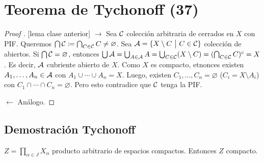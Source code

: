 
\section{Teorema de Tychonoff (37)}

\begin{proof}[Proof ][lema clase anterior]
	$\boxed{\rightarrow}$ Sea $\mathcal{C}$ colección arbitraria de cerrados en $X$ con PIF. Queremos $\bigcap \mathcal{C} \coloneq \bigcap_{C \in \mathcal{C}} C \neq \varnothing$. Sea $\mathcal{A} = \{X \setminus C \ \big| \ C \in \mathcal{C}\}$ colección de abiertos. Si $\bigcap \mathcal{C} = \varnothing$, entonces $\bigcup \mathcal{A} = \bigcup_{A \in \mathcal{A}} A = \bigcup_{C \in \mathcal{C}} (X \setminus C) = (\bigcap_{C \in \mathcal{C}} C)^c = X$. Es decir, $\mathcal{A}$ cubriente abierto de $X$. Como $X$ es compacto, etnonces existen $A_{1},\dots,A_{n} \in \mathcal{A}$ con $A_{1} \cup \cdots \cup A_{n} = X$. Luego, existen $C_{1},\dots,C_{n} = \varnothing$ ($C_{i} = X \setminus A_{i}$) con $C_{1} \cap \cdots \cap C_{n} = \varnothing$. Pero esto contradice que $\mathcal{C}$ tenga la PIF.\par
	$\boxed{\leftarrow}$ Análogo.
\end{proof}

\subsection{Demostración Tychonoff}

\begin{theorem}[Tychonoff]
	$Z = \prod_{\alpha \in J} X_{\alpha}$ producto arbitrario de espacios compactos. Entonces $Z$ compacto.
\end{theorem}

